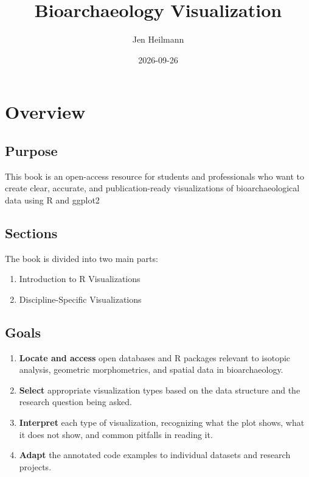 \documentclass[
  letterpaper,
  DIV=11,
  numbers=noendperiod]{scrreprt}
\title{Bioarchaeology Visualization}
\author{Jen Heilmann}
\date{2026-09-26}
\providecommand{\tightlist}{%
  \setlength{\itemsep}{0pt}\setlength{\parskip}{0pt}}
\renewcommand*\contentsname{Table of contents}
\newcommand\contentsname{Table of contents}
\begin{document}
\maketitle

\renewcommand*\contentsname{Table of contents}
{
\setcounter{tocdepth}{2}
\tableofcontents
}


\chapter*{Overview}\label{overview}


\section*{Purpose}\label{purpose}


This book is an open-access resource for students and professionals who
want to create clear, accurate, and publication-ready visualizations of
bioarchaeological data using R and ggplot2

\section*{Sections}\label{sections}


The book is divided into two main parts:

\begin{enumerate}
\def\labelenumi{\arabic{enumi}.}
\tightlist
\item
  Introduction to R Visualizations
\item
  Discipline-Specific Visualizations
\end{enumerate}

\section*{Goals}\label{goals}


\begin{enumerate}
\def\labelenumi{\arabic{enumi}.}
\tightlist
\item
  \textbf{Locate and access} open databases and R packages relevant to
  isotopic analysis, geometric morphometrics, and spatial data in
  bioarchaeology.
\item
  \textbf{Select} appropriate visualization types based on the data
  structure and the research question being asked.
\item
  \textbf{Interpret} each type of visualization, recognizing what the
  plot shows, what it does not show, and common pitfalls in reading it.
\item
  \textbf{Adapt} the annotated code examples to individual datasets and
  research projects.
\end{enumerate}
\end{document}
